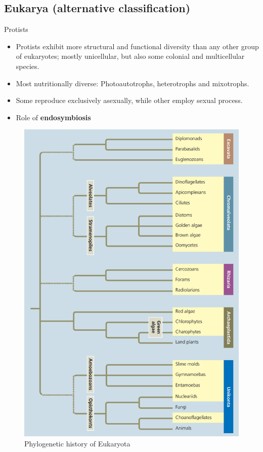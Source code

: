 \documentclass[ignorenonframetext,aspectratio=169]{beamer}
\providecommand{\tightlist}{%
  \setlength{\itemsep}{0pt}\setlength{\parskip}{0pt}}
\begin{document}
\hypertarget{eukarya-alternative-classification}{%
\subsection{Eukarya (alternative
classification)}\label{eukarya-alternative-classification}}

\begin{frame}{Protists}
\protect\hypertarget{protists}{}

\begin{itemize}
\tightlist
\item
  Protists exhibit more structural and functional diversity than any
  other group of eukaryotes; mostly unicellular, but also some colonial
  and multicellular species.
\item
  Most nutritionally diverse: Photoautotrophs, heterotrophs and
  mixotrophs.
\item
  Some reproduce exclusively asexually, while other employ sexual
  process.
\item
  Role of \textbf{endosymbiosis}
\end{itemize}

\end{frame}

\begin{frame}{}
\protect\hypertarget{section-15}{}

\begin{figure}
\includegraphics[width=0.35\linewidth]{./../images/protistan_diversity} \caption{Phylogenetic history of Eukaryota}\label{fig:protistan-diversity}
\end{figure}

\end{frame}
\end{document}
